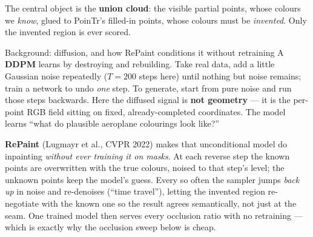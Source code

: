 \documentclass[11pt]{article}
\begin{document}
The central object is the \textbf{union cloud}: the visible partial points, whose colours we
\emph{know}, glued to PoinTr's filled-in points, whose colours must be \emph{invented}. Only
the invented region is ever scored.

\begin{primer}{Background: diffusion, and how RePaint conditions it without retraining}
A \textbf{DDPM} learns by destroying and rebuilding. Take real data, add a little Gaussian
noise repeatedly ($T{=}200$ steps here) until nothing but noise remains; train a network to
undo \emph{one} step. To generate, start from pure noise and run those steps backwards. Here
the diffused signal is \textbf{not geometry} --- it is the per-point RGB field sitting on
fixed, already-completed coordinates. The model learns ``what do plausible aeroplane
colourings look like?''

\textbf{RePaint} (Lugmayr et al., CVPR 2022) makes that unconditional model do inpainting
\emph{without ever training it on masks}. At each reverse step the known points are
overwritten with the true colours, noised to that step's level; the unknown points keep the
model's guess. Every so often the sampler jumps \emph{back up} in noise and re-denoises
(``time travel''), letting the invented region re-negotiate with the known one so the result
agrees semantically, not just at the seam. One trained model then serves every occlusion
ratio with no retraining --- which is exactly why the occlusion sweep below is cheap.
\end{primer}

\begin{center}
\end{center}
\end{document}
